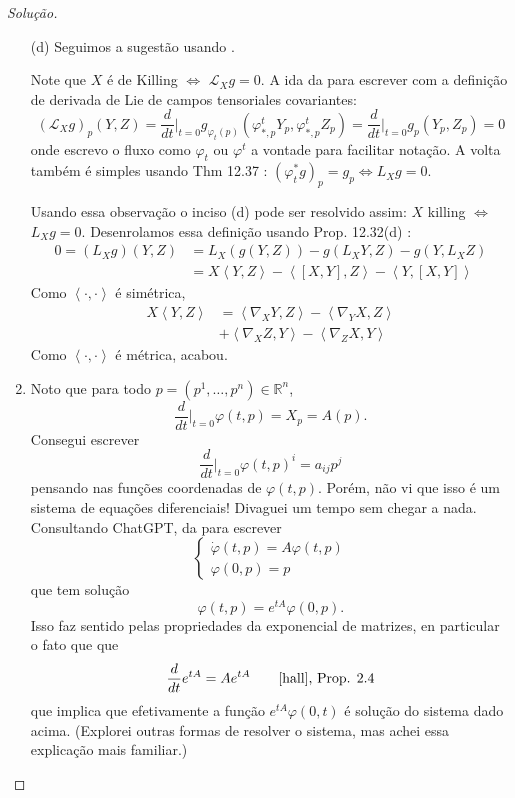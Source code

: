 \begin{proof}[Solução]\leavevmode
\begin{enumerate}[label=(\alph*)]
	\item[(d)] Seguimos a sugestão usando \cite{les}.

	\begin{remark}\leavevmode
	Note que \(X\) é de Killing \(\iff\) \(\mathcal{L}_Xg=0\). A ida da para escrever com a definição de derivada de Lie de campos tensoriales covariantes:
	\[(\mathcal{L}_Xg)_p(Y,Z)=\frac{d}{dt}\Big|_{t=0}g_{\varphi_t(p)}(\varphi^t_{*,p}Y_p,\varphi^t_{*,p}Z_p)=\frac{d}{dt}\Big|_{t=0}g_p(Y_p,Z_p)=0\]
onde escrevo o fluxo como \(\varphi_t\) ou \(\varphi^t\) a vontade para facilitar notação. A volta também é simples usando Thm 12.37 \cite{les}: \((\varphi_t^*g)_p=g_p \iff L_Xg=0\).
	\end{remark}
	Usando essa observação o inciso (d)  pode ser resolvido assim: \(X\) killing \(\iff\) \(L_Xg=0\). Desenrolamos essa definição usando Prop. 12.32(d) \cite{les}:
	\begin{align*}
		0=(L_Xg)(Y,Z)&=L_X(g(Y,Z))-g(L_XY,Z)-g(Y,L_XZ)\\
			     &=X\left<Y,Z\right>-\left<[X,Y],Z\right>-\left<Y,[X,Y]\right>
	\end{align*}
	Como \(\left<\cdot,\cdot\right>\) é simétrica,
	\begin{align*}
	X\left<Y,Z\right>&=\left<\nabla_XY,Z\right>-\left<\nabla_YX,Z\right>\\
	&+\left<\nabla_XZ,Y\right>-\left<\nabla_ZX,Y\right>
	\end{align*}
	Como \(\left<\cdot,\cdot\right>\) é métrica, acabou.

\item Noto que para todo \(p=(p^1,\ldots,p^n) \in \mathbb{R}^n\),
	\[\frac{d}{dt}\Big|_{t=0}\varphi(t,p)=X_p=A(p).\]
	Consegui escrever
	\[\frac{d}{dt}\Big|_{t=0}\varphi(t,p)^i=a_{ij}p^j\]
pensando nas funções coordenadas de \(\varphi(t,p)\). Porém, não vi que isso é um sistema de equações diferenciais! Divaguei um tempo sem chegar a nada. Consultando ChatGPT, da para escrever
\[\begin{cases}
	\dot \varphi(t,p)=A \varphi(t,p) \\
	\varphi(0,p)=p\qquad
\end{cases}\]
que tem solução
\[\varphi(t,p)=e^{tA}\varphi(0,p).\]
Isso faz sentido pelas propriedades da exponencial de matrizes, en particular o fato que que
\[\frac{d}{dt}e^{tA}=Ae^{tA}\qquad \text{\cite{hall}, Prop. 2.4} \]
que implica que efetivamente a função \(e^{tA}\varphi(0,t)\) é solução do sistema dado acima. (Explorei outras formas de resolver o sistema, mas achei essa explicação mais familiar.)


\end{enumerate}
\end{proof}
